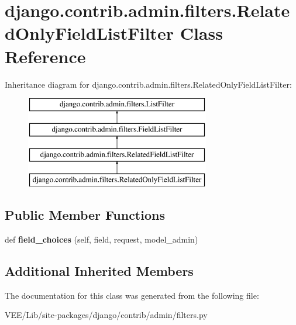 \hypertarget{classdjango_1_1contrib_1_1admin_1_1filters_1_1_related_only_field_list_filter}{}\section{django.\+contrib.\+admin.\+filters.\+Related\+Only\+Field\+List\+Filter Class Reference}
\label{classdjango_1_1contrib_1_1admin_1_1filters_1_1_related_only_field_list_filter}
Inheritance diagram for django.\+contrib.\+admin.\+filters.\+Related\+Only\+Field\+List\+Filter\+:\begin{figure}[H]
\begin{center}
\leavevmode
\includegraphics[height=4.000000cm]{classdjango_1_1contrib_1_1admin_1_1filters_1_1_related_only_field_list_filter}
\end{center}
\end{figure}
\subsection*{Public Member Functions}
\begin{DoxyCompactItemize}
\item 
\mbox{\label{classdjango_1_1contrib_1_1admin_1_1filters_1_1_related_only_field_list_filter_ada6eb7c5f05887eff5627991ae98f996}} 
def {\bfseries field\+\_\+choices} (self, field, request, model\+\_\+admin)
\end{DoxyCompactItemize}
\subsection*{Additional Inherited Members}


The documentation for this class was generated from the following file\+:\begin{DoxyCompactItemize}
\item 
V\+E\+E/\+Lib/site-\/packages/django/contrib/admin/filters.\+py\end{DoxyCompactItemize}

